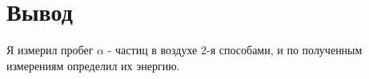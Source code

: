 \documentclass[a4paper,14pt]{extarticle}
\begin{document}

	\section{Вывод} %
	\label{sec:вывод}
	Я измерил пробег $\alpha$ - частиц в воздухе 2-я способами, и по полученным измерениям определил их энергию.
\end{document}
